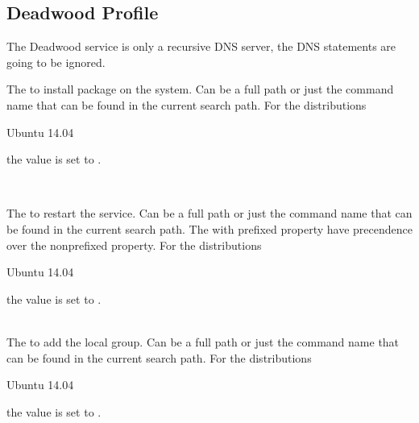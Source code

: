 \label{sec:deadwood_profile}
\subsection{Deadwood Profile}

The Deadwood service is only a recursive DNS server, the 
DNS  statements are going to be ignored.


The  to install package on the system. Can be a full path or
just the command name that can be found in the current search path. 
For the distributions
\begin{inparaitem}
\item[\TheDistribution{ubuntu}] Ubuntu 14.04
\end{inparaitem}
the value is set to .

\\

The  to restart the service. Can be a full path or
just the command name that can be found in the current search path. 
The with  prefixed property have precendence over the 
nonprefixed property.
For the distributions
\begin{inparaitem}
\item[\TheDistribution{ubuntu}] Ubuntu 14.04
\end{inparaitem}
the value is set to .

\\

The  to add the local group. Can be a full path or
just the command name that can be found in the current search path. 
For the distributions
\begin{inparaitem}
\item[\TheDistribution{ubuntu}] Ubuntu 14.04
\end{inparaitem}
the value is set to .

